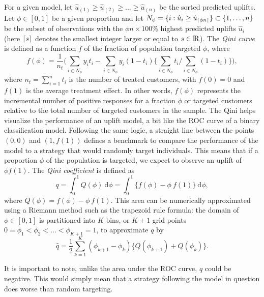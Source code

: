 \documentclass{article}
\def \real{\rm I\!R}
\DeclarePairedDelimiter{\ceil}{\lceil}{\rceil}
\begin{document}
For a given model, let $\hat{u}_{(1)} \geq \hat{u}_{(2)} \geq ... \geq \hat{u}_{(n)}$ be the sorted predicted uplifts. Let $\phi \in [0,1]$ be a given proportion and let $ N_{\phi} = \{i: \hat{u}_{i} \geq \hat{u}_{\ceil{\phi n}} \} \subset \lbrace 1, \ldots, n \rbrace$ be the subset of observations with the $\phi n \times 100 \%$ highest predicted uplifts $\hat{u}_i$ (here $\ceil{s}$ denotes the smallest integer larger or equal to $s\in \real$). The \textit{Qini curve} is defined as a function $f$ of the fraction of population targeted $\phi$, where 
\begin{equation*}
    f(\phi) = \frac{1}{n_t}\biggl(\sum\limits_{i \in  N_{\phi}} y_i t_i - \sum\limits_{i \in  N_{\phi}} y_i (1-t_i) \biggl\{ \sum\limits_{i \in  N_{\phi}} t_i / \sum\limits_{i \in  N_{\phi}} (1-t_i) \biggr\} \biggr),
\end{equation*}
where $n_t = \sum_{i=1}^n t_i$ is the number of treated customers, with $f(0)=0$ and $f(1)$ is the average treatment effect. In other words, $f(\phi)$ represents the incremental number of positive responses for a fraction $\phi$ or targeted customers relative to the total number of targeted customers in the sample. The Qini helps visualize the performance of an uplift model, a bit like the ROC curve of a binary classification model. Following the same logic, a straight line between the points $(0,0)$ and $(1, f(1))$ defines a benchmark to compare the performance of the model to a strategy that would randomly target individuals. This means that if a proportion $\phi$ of the population is targeted, we expect to observe an uplift of $\phi f(1)$.
The {\it Qini coefficient} is defined as
\begin{equation*}
     q = \int_0^1 Q(\phi) ~\mathrm{d}\phi = \int_0^1 \{f(\phi) - \phi~f(1)\} ~\mathrm{d}\phi,
\end{equation*}
where $Q(\phi) = f(\phi) - \phi~f(1)$. This area can be numerically approximated using a Riemann method such as the trapezoid rule formula: the domain of $\phi \in [0,1]$ is partitioned into $K$ bins, or $K+1$ grid points $0=\phi_1 < \phi_2 < ... < \phi_{K+1} = 1$, to approximate $q$ by
\begin{equation}
  \hat{q} = \dfrac{1}{2} \sum_{k=1}^K (\phi_{k+1}-\phi_k)\{Q(\phi_{k+1}) + Q(\phi_{k})\}.
  \label{eq:q:hat}
\end{equation}

It is important to note, unlike the area under the ROC curve, $\hat{q}$ could be negative. This would simply mean that a strategy following the model in question does worse than random targeting. 
\end{document}
